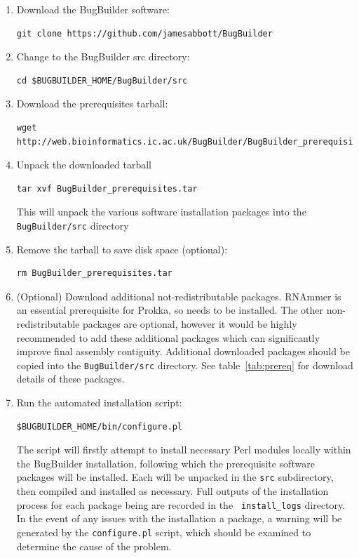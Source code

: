 \documentclass[a4paper,10pt]{article}
\begin{document}
\begin{enumerate}
\item Download the BugBuilder software: 
\begin{verbatim}git clone https://github.com/jamesabbott/BugBuilder\end{verbatim}
\item Change to the BugBuilder src directory:
\begin{verbatim}cd $BUGBUILDER_HOME/BugBuilder/src\end{verbatim}
\item Download the prerequisites tarball: 
\begin{verbatim}wget http://web.bioinformatics.ic.ac.uk/BugBuilder/BugBuilder_prerequisites.tar\end{verbatim}
\item Unpack the downloaded tarball
\begin{verbatim}tar xvf BugBuilder_prerequisites.tar\end{verbatim}
This will unpack the various software installation packages into the {\tt
BugBuilder/src} directory
\item Remove the tarball to save disk space (optional):
\begin{verbatim}rm BugBuilder_prerequisites.tar\end{verbatim}
\item (Optional) Download additional not-redistributable packages. RNAmmer is
an essential prerequisite for Prokka, so needs to be installed. The other
non-redistributable packages are optional, however it would be highly
recommended to add these additional packages which can significantly improve final
assembly contiguity. Additional downloaded packages should be copied into the
{\tt BugBuilder/src} directory. See table~\ref{tab:prereq} for download details
of these packages.
\item Run the automated installation script:
\begin{verbatim}$BUGBUILDER_HOME/bin/configure.pl\end{verbatim}

The script will firstly attempt to install necessary Perl modules locally
within the BugBuilder installation, following which the prerequisite software
packages will be installed. Each will be unpacked in the {\tt src}
subdirectory, then compiled and installed as necessary. Full outputs of the
installation process for each package being are recorded in the {\tt
install\_logs} directory. In the event of any issues with the installation a
package, a warning will be generated by the {\tt configure.pl} script, which
should be examined to determine the cause of the problem.


\end{enumerate}
\end{document}
